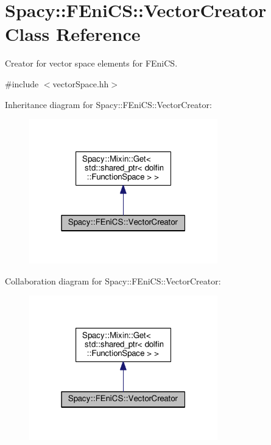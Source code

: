 \hypertarget{classSpacy_1_1FEniCS_1_1VectorCreator}{}\section{Spacy\+:\+:F\+Eni\+CS\+:\+:Vector\+Creator Class Reference}
\label{classSpacy_1_1FEniCS_1_1VectorCreator}


Creator for vector space elements for F\+Eni\+CS.  




{\ttfamily \#include $<$vector\+Space.\+hh$>$}



Inheritance diagram for Spacy\+:\+:F\+Eni\+CS\+:\+:Vector\+Creator\+:
\nopagebreak
\begin{figure}[H]
\begin{center}
\leavevmode
\includegraphics[width=232pt]{classSpacy_1_1FEniCS_1_1VectorCreator__inherit__graph}
\end{center}
\end{figure}


Collaboration diagram for Spacy\+:\+:F\+Eni\+CS\+:\+:Vector\+Creator\+:
\nopagebreak
\begin{figure}[H]
\begin{center}
\leavevmode
\includegraphics[width=232pt]{classSpacy_1_1FEniCS_1_1VectorCreator__coll__graph}
\end{center}
\end{figure}
